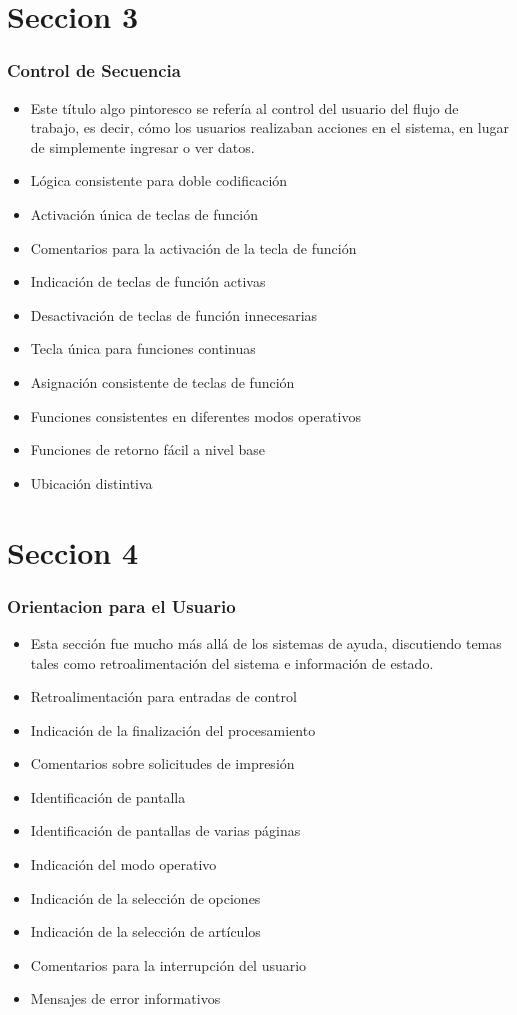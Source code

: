 \documentclass[11pt]{beamer}
\begin{document}
\section{Seccion 3}
\begin{frame}
\frametitle{Control de Secuencia}
\begin{itemize}
\item Este título algo pintoresco se refería al control del usuario del flujo de trabajo, es decir, cómo los usuarios realizaban acciones en el sistema, en lugar de simplemente ingresar o ver datos.
\item Lógica consistente para doble codificación
\item Activación única de teclas de función
\item Comentarios para la activación de la tecla de función
\item Indicación de teclas de función activas
\item Desactivación de teclas de función innecesarias
\item Tecla única para funciones continuas
\item Asignación consistente de teclas de función   
\item Funciones consistentes en diferentes modos operativos
\item Funciones de retorno fácil a nivel base
\item Ubicación distintiva
\end{itemize}
\end{frame}

\section{Seccion 4}
\begin{frame}
\frametitle{Orientacion para el Usuario}
\begin{itemize}
\item Esta sección fue mucho más allá de los sistemas de ayuda, discutiendo temas tales como retroalimentación del sistema e información de estado.
\item Retroalimentación para entradas de control
\item Indicación de la finalización del procesamiento
\item Comentarios sobre solicitudes de impresión
\item Identificación de pantalla
\item Identificación de pantallas de varias páginas
\item Indicación del modo operativo
\item Indicación de la selección de opciones
\item Indicación de la selección de artículos
\item Comentarios para la interrupción del usuario
\item Mensajes de error informativos
\end{itemize}
\end{frame}
\end{document}
